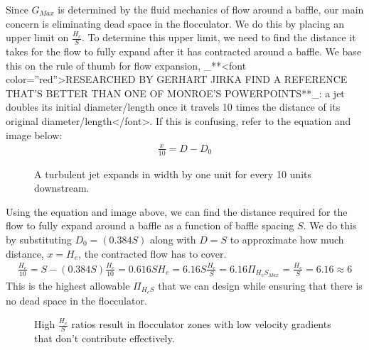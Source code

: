 \documentclass[letterpaper,10pt,english]{sphinxmanual}
\let\sphinxpxdimen\pdfpxdimen\else\newdimen\sphinxpxdimen
\begin{document}
Since \(G_{Max}\) is determined by the fluid mechanics of flow around a baffle, our main concern is eliminating dead space in the flocculator. We do this by placing an upper limit on \(\frac{H_e}{S}\). To determine this upper limit, we need to find the distance it takes for the flow to fully expand after it has contracted around a baffle. We base this on the rule of thumb for flow expansion, \_**\textless{}font color=”red”\textgreater{}RESEARCHED BY GERHART JIRKA FIND A REFERENCE THAT’S BETTER THAN ONE OF MONROE’S POWERPOINTS**\_: a jet doubles its initial diameter/length once it travels 10 times the distance of its original diameter/length\textless{}/font\textgreater{}. If this is confusing, refer to the equation and image below:
\begin{equation}\label{equation:Flocculation/Floc_Design:Flocculation/Floc_Design:11}
\begin{split}\frac{x}{10} = D - D_0\end{split}
\end{equation}
\begin{figure}[htbp]
\centering
\capstart

\noindent\sphinxincludegraphics[width=400\sphinxpxdimen]{{Jet_expansion_flocculator}.jpg}
\caption{A turbulent jet expands in width by one unit for every 10 units downstream.}\label{\detokenize{Flocculation/Floc_Design:id9}}\label{\detokenize{Flocculation/Floc_Design:figure-jet-expansion-flocculator}}\end{figure}

Using the equation and image above, we can find the distance required for the flow to fully expand around a baffle as a function of baffle spacing \(S\). We do this by substituting  \(D_0 = (0.384 S)\) along with \(D = S\) to approximate how much distance, \(x = H_e\), the contracted flow has to cover.
\begin{equation}\label{equation:Flocculation/Floc_Design:Flocculation/Floc_Design:12}
\begin{split}\frac{H_e}{10} = S - (0.384 S)
\frac{H_e}{10} = 0.616 S
H_e = 6.16S
\frac{H_e}{S} = 6.16
\Pi_{H_eS_{Max}} = \frac{H_e}{S} = 6.16 \approx 6\end{split}
\end{equation}
This is the highest allowable \(\Pi_{H_eS}\) that we can design while ensuring that there is no dead space in the flocculator.

\begin{figure}[htbp]
\centering
\capstart

\noindent{}
\caption{High \(\frac{H_e}{S}\) ratios result in flocculator zones with low velocity gradients that don’t contribute effectively.}\label{\detokenize{Flocculation/Floc_Design:id10}}\label{\detokenize{Flocculation/Floc_Design:figure-cfd-baffle-image}}\end{figure}
\end{document}
